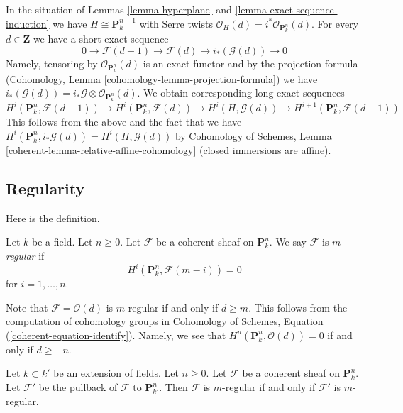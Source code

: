 \begin{remark}
\label{remark-exact-sequence-induction-cohomology}
In the situation of Lemmas \ref{lemma-hyperplane} and
\ref{lemma-exact-sequence-induction}
we have $H \cong \mathbf{P}^{n - 1}_k$ with Serre twists
$\mathcal{O}_H(d) = i^*\mathcal{O}_{\mathbf{P}^n_k}(d)$.
For every $d \in \mathbf{Z}$ we have a short exact sequence
$$
0 \to \mathcal{F}(d - 1) \to \mathcal{F}(d) \to i_*(\mathcal{G}(d)) \to 0
$$
Namely, tensoring by $\mathcal{O}_{\mathbf{P}^n_k}(d)$ is an
exact functor and by the projection formula
(Cohomology, Lemma \ref{cohomology-lemma-projection-formula})
we have
$i_*(\mathcal{G}(d)) = i_*\mathcal{G} \otimes \mathcal{O}_{\mathbf{P}^n_k}(d)$.
We obtain corresponding long exact sequences
$$
H^i(\mathbf{P}^n_k, \mathcal{F}(d - 1)) \to
H^i(\mathbf{P}^n_k, \mathcal{F}(d)) \to
H^i(H, \mathcal{G}(d)) \to
H^{i + 1}(\mathbf{P}^n_k, \mathcal{F}(d - 1))
$$
This follows from the above and the fact that we have
$H^i(\mathbf{P}^n_k, i_*\mathcal{G}(d)) = H^i(H, \mathcal{G}(d))$ by
Cohomology of Schemes, Lemma \ref{coherent-lemma-relative-affine-cohomology}
(closed immersions are affine).
\end{remark}





\subsection{Regularity}
\label{subsection-regularity}

\noindent
Here is the definition.

\begin{definition}
\label{definition-regularity}
Let $k$ be a field. Let $n \geq 0$. Let $\mathcal{F}$ be a coherent
sheaf on $\mathbf{P}^n_k$. We say $\mathcal{F}$ is {\it $m$-regular}
if
$$
H^i(\mathbf{P}^n_k, \mathcal{F}(m - i)) = 0
$$
for $i = 1, \ldots, n$.
\end{definition}

\noindent
Note that $\mathcal{F} = \mathcal{O}(d)$ is $m$-regular if and only
if $d \geq m$. This follows from the computation of cohomology groups
in Cohomology of Schemes, Equation (\ref{coherent-equation-identify}).
Namely, we see that $H^n(\mathbf{P}^n_k, \mathcal{O}(d)) = 0$
if and only if $d \geq -n$.

\begin{lemma}
\label{lemma-m-regular-extend-base-field}
Let $k \subset k'$ be an extension of fields. Let $n \geq 0$.
Let $\mathcal{F}$ be a coherent sheaf on $\mathbf{P}^n_k$.
Let $\mathcal{F}'$ be the pullback of $\mathcal{F}$ to $\mathbf{P}^n_{k'}$.
Then $\mathcal{F}$ is $m$-regular if and only if $\mathcal{F}'$ is
$m$-regular.
\end{lemma}

